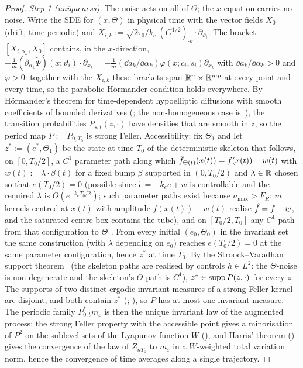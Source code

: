 \begin{proof}
\smallskip
\emph{Step 1 (uniqueness).} The noise acts on all of $\Theta$; the $x$-equation carries no noise. Write the SDE for
$(x,\Theta)$ in physical time with the vector fields $X_0$ (drift, time-periodic) and
$X_{i,k} := \sqrt{2\tau_0/k_e}\,(G^{1/2})_{\cdot k}\cdot\partial_{\vartheta_i}$. The bracket $[X_{i,\alpha_k},X_0]$
contains, in the $x$-direction, $-\frac1m(\partial_{\alpha_k}\tilde\Phi)(x;\vartheta_i)\cdot\partial_{x_k}
= -\frac1m(\dd a_k/\dd\alpha_k)\varphi(x;c_i,s_i)\partial_{x_k}$ with $\dd a_k/\dd\alpha_k > 0$ and $\varphi > 0$:
together with the $X_{i,k}$ these brackets span $\mathbb{R}^n\times\mathbb{R}^{mp}$ at every point and every time, so the parabolic
H\"ormander condition holds everywhere. By H\"ormander's theorem for time-dependent hypoelliptic diffusions with smooth
coefficients of bounded derivatives (\cite{S25}; the non-homogeneous case is~\cite{S26}), the transition
probabilities $P_{s,t}(z,\cdot)$ have densities that are smooth in $z$, so the period map $P := P_{0,T_0}$ is strong
Feller. Accessibility: fix $\Theta_1$ and let $z^* := (e^*,\Theta_1)$ be the state at time $T_0$ of the deterministic
skeleton that follows, on $[0,T_0/2]$, a $C^1$ parameter path along which $\hat f_{\Theta(t)}(x(t)) = f(x(t)) - w(t)$
with $w(t) := \lambda\cdot\beta(t)$ for a fixed bump $\beta$ supported in $(0,T_0/2)$ and $\lambda\in\mathbb{R}$ chosen so
that $e(T_0/2) = 0$ (possible since $\dot e = -k_ee + w$ is controllable and the required $\lambda$ is
$O(e^{-k_eT_0/2})$; such parameter paths exist because $a_{\max} > F_R$: $m$ kernels centred at $x(t)$ with amplitude
$f(x(t)) - w(t)$ realise $\hat f = f - w$, and the saturated centre box contains the tube), and on $[T_0/2,T_0]$ any
$C^1$ path from that configuration to $\Theta_1$. From every initial $(e_0,\Theta_0)$ in the invariant set the same
construction (with $\lambda$ depending on $e_0$) reaches $e(T_0/2) = 0$ at the same parameter configuration, hence
$z^*$ at time $T_0$. By the Stroock--Varadhan support theorem~\cite{S27} (the skeleton paths are realised by controls
$h\in L^2$: the $\Theta$-noise is non-degenerate and the skeleton's $\Theta$-path is $C^1$), $z^*\in\operatorname{supp} P(z,\cdot)$
for every $z$. The supports of two distinct ergodic invariant measures of a strong Feller kernel are disjoint, and
both contain $z^*$ (\cite[Prop.~4.1.1 and Thm~4.2.1]{S28}; \cite[Cor.~1.14--Thm~1.16]{S32}), so $P$ has at most one
invariant measure. The periodic family $P_{0,t}^*m_\varepsilon$ is then the unique invariant law of the augmented
process; the strong Feller property with the accessible point gives a minorisation of $P^2$ on the sublevel sets of
the Lyapunov function $W$ (\cite[Lemma~1.13]{S32}), and Harris' theorem (\cite{S33}) gives the convergence of the law
of $Z_{nT_0}$ to $m_\varepsilon$ in a $W$-weighted total variation norm, hence the convergence of time averages along
a single trajectory.


\end{proof}
